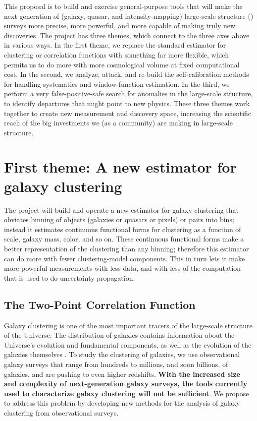 \documentclass[12pt, fullpage, letterpaper]{article}
\begin{document}
This proposal is to build and exercise general-purpose tools that will
make the next generation of (galaxy, quasar, and intensity-mapping)
large-scale structure (\LSS) surveys more precise, more powerful, and
more capable of making truly new discoveries.
The project has three themes, which connect to the three axes above in
various ways.
In the first theme, we replace the standard estimator for clustering or
correlation functions with something far more flexible, which permits us
to do more with more cosmological volume at fixed computational cost.
In the second, we analyze, attack, and re-build the self-calibration 
methods for handling systematics and window-function estimation.
In the third, we perform a very false-positive-safe search for anomalies
in the large-scale structure, to identify departures that might point to
new physics.
These three themes work together to create new measurement and discovery space,
increasing the scientific reach of the big investments we (as a community)
are making in large-scale structure.

\section{First theme: A new estimator for galaxy clustering}

The project will build and operate a new estimator for
galaxy clustering that obviates binning of objects (galaxies or
quasars or pixels) or pairs into bins; instead it estimates continuous
functional forms for clustering as a function of scale, galaxy mass,
color, and so on.
These continuous functional forms make a better representation of the
clustering than any binning; therefore this estimator can do more with
fewer clustering-model components.
This in turn lets it make more powerful measurements with less data,
and with less of the computation that is used to do uncertainty
propagation.

\subsection{The Two-Point Correlation Function}

Galaxy clustering is one of the most important tracers of the large-scale structure of the Universe.
The distribution of galaxies contains information about the Universe's evolution and fundamental components, as well as the evolution of the galaxies themselves \citealt{Hamilton1988}.
To study the clustering of galaxies, we use observational galaxy surveys that range from hundreds to millions, and soon billions, of galaxies, and are pushing to even higher redshifts.
\textbf{With the increased size and complexity of next-generation galaxy surveys, the tools currently used to characterize galaxy clustering will not be sufficient}.
We propose to address this problem by developing new methods for the analysis of galaxy clustering from observational surveys.
\end{document}
